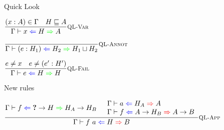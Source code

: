 \documentclass{beamer}
\begin{document}
\newcommand{\fullquicklookhinting}[4]{#1 \vdash #2 \mathcolor{blue}{\Leftarrow} #3 \mathcolor{green}{\Rightarrow} #4}
\newcommand{\quicklookhinting}[3]{\fullquicklookhinting{\Gamma}{#1}{#2}{#3}}

\begin{frame}{Quick Look}

\begin{center}
  $\infrule[QL-Var]{\sidecond{(x : A) \in \Gamma} \quad \sidecond{\hintorder{H}{A}}}{\quicklookhinting{x}{H}{A}}$

  \vspace{2em}

  $\infrule[QL-Annot]{}{\quicklookhinting{\annot{e}{H_1}}{H_2}{\hintlub{H_1}{H_2}}}$

  \vspace{2em}

  $\infrule[QL-Fail]{\sidecond{e \neq x} \quad \sidecond{e \neq \annot{e'}{H'}}}{\quicklookhinting{e}{H}{H}}$
\end{center}

\end{frame}

\begin{frame}{New rules}

\begin{center}
  $\infrule[QL-App]{\quicklookhinting{f}{\Fun{\Hole}{H}}{\Fun{H_A}{H_B}} \quad \begin{array}{l} \hinting{a}{H_A}{A} \\ \hinting{f}{\Fun{A}{H_B}}{\Fun{A}{B}} \end{array}}{\hinting{\app{f}{a}}{H}{B}}$
\end{center}

\end{frame}

\newcommand{\qldeep}[6]{#1 \vdash #2 \mathcolor{blue}{\Leftarrow} #3 \mathcolor{green}{\Rightarrow} #4\ ;\ #5\ ;\ #6}
\end{document}
